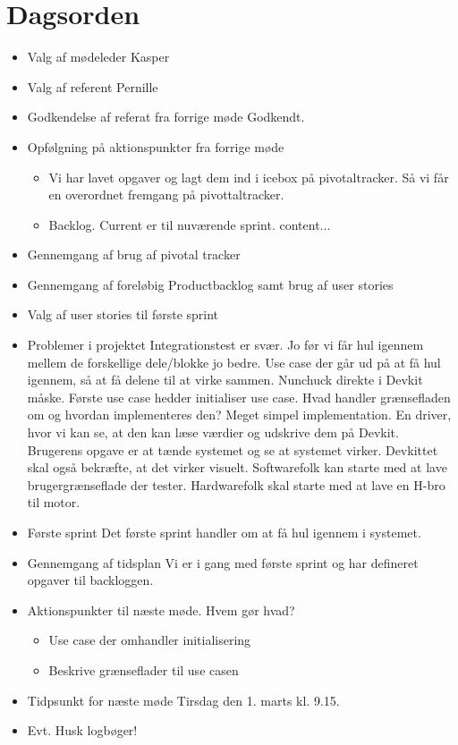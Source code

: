 \documentclass{article}
\begin{document}
	\section{Dagsorden}
	\begin{itemize}
		\item Valg af mødeleder
		\subitem Kasper 
		\item Valg af referent
		\subitem Pernille
		\item Godkendelse af referat fra forrige møde 
		\subitem Godkendt. 
		\item Opfølgning på aktionspunkter fra forrige møde
		\begin{itemize}
			\item Vi har lavet opgaver og lagt dem ind i icebox på pivotaltracker. Så vi får en overordnet fremgang på pivottaltracker. 
			\item Backlog. Current er til nuværende sprint. 
			content...
		\end{itemize}
		\item Gennemgang af brug af pivotal tracker
		\item Gennemgang af foreløbig Productbacklog samt brug af user stories
		\item Valg af user stories til første sprint 
		\item Problemer i projektet 
		\subitem Integrationstest er svær. Jo før vi får hul igennem mellem de forskellige dele/blokke jo bedre. Use case der går ud på at få hul igennem, så at få delene til at virke sammen. Nunchuck direkte i Devkit måske. Første use case hedder initialiser use case. Hvad handler grænsefladen om og hvordan implementeres den? Meget simpel implementation. En driver, hvor vi kan se, at den kan læse værdier og udskrive dem på Devkit. Brugerens opgave er at tænde systemet og se at systemet virker. Devkittet skal også bekræfte, at det virker visuelt. Softwarefolk kan starte med at lave brugergrænseflade der tester. Hardwarefolk skal starte med at lave en H-bro til motor. 
		\item Første sprint 
		\subitem Det første sprint handler om at få hul igennem i systemet. 
		\item Gennemgang af tidsplan
		\subitem Vi er i gang med første sprint og har defineret opgaver til backloggen. 
		\item Aktionspunkter til næste møde. Hvem gør hvad? 
		\begin{itemize} 
			\item Use case der omhandler initialisering
			\item Beskrive grænseflader til use casen
		\end{itemize}
		\item Tidpsunkt for næste møde 
		\subitem Tirsdag den 1. marts kl. 9.15. 
		\item Evt. 
		\subitem Husk logbøger! 
	\end{itemize}
\end{document}
